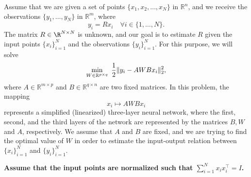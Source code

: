 Assume that we are given a set of points $\{x_1, x_2, \dots, x_N\}$ in $\mathbb R^n$, and we receive the observations $\{y_1, \dots, y_N\}$ in $\mathbb R^m$, where
    \[ y_i = R x_i \quad \forall i \in \{1, \dots, N\}. \]
    The matrix $R \in \R^{N \times N}$ is unknown, and our goal is to estimate $R$ given the input points $\{x_i\}_{i=1}^N$ and the observations $\{y_i\}_{i=1}^N$. For this purpose, we will solve
    \[ \min_{W \in \mathbb R^{p \times q}} \ {1 \over 2} \| y_i - AWBx_i\|_2^2, \]
    where $A \in \mathbb R^{m \times p}$ and $B \in \mathbb R^{q\times n}$ are two fixed matrices. In this problem, the mapping
    \[ x_i \mapsto AWB x_i \]
    represents a simplified (linearized) three-layer neural network, where the first, second, and the third layers of the network are represented by the matrices $B, W$ and $A$, respectively. We assume that $A$ and $B$ are fixed, and we are trying to find the optimal value of $W$ in order to estimate the input-output relation between $\{x_i\}_{i=1}^N$ and $\{y_i\}_{i=1}^N$.
    
 \textbf{Assume that the input points are normalized such that $\sum_{i=1}^N x_i x_i^\top = I$.}

